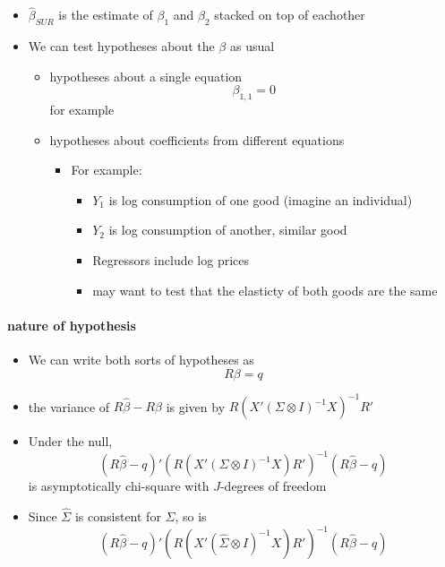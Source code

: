 \begin{itemize}
\item $\hat\beta_{SUR}$ is the estimate of $\beta_1$ and $\beta_2$
        stacked on top of eachother
\item We can test hypotheses about the $\beta$ as usual
\begin{itemize}
\item hypotheses about a single equation
          \[ \beta_{1,1} = 0 \]
          for example
\item hypotheses about coefficients from different equations
\begin{itemize}
\item For example:
\begin{itemize}
\item $Y_1$ is log consumption of one good (imagine an individual)
\item $Y_2$ is log consumption of another, similar good
\item Regressors include log prices
\item may want to test that the elasticty of both goods are
              the same
\end{itemize}
\end{itemize}
\end{itemize}
\end{itemize}
\paragraph{nature of hypothesis}
\label{sec-2-6-2}

\begin{itemize}
\item We can write both sorts of hypotheses as
        \[ R \beta = q \]
\item the variance of $R\hat\beta - R\beta$ is given by $R(X'(\Sigma
        \otimes I)^{-1}X)^{-1}R'$
\item Under the null, 
        \[(R\hat\beta - q)'\left(R(X'(\Sigma \otimes
        I)^{-1}X)R'\right)^{-1}(R\hat\beta - q)\] is asymptotically
        chi-square with $J$-degrees of freedom
\item Since $\hat\Sigma$ is consistent for $\Sigma$, so is
        \[(R\hat\beta - q)'\left(R(X'(\hat\Sigma \otimes
        I)^{-1}X)R'\right)^{-1}(R\hat\beta - q)\]
\end{itemize}